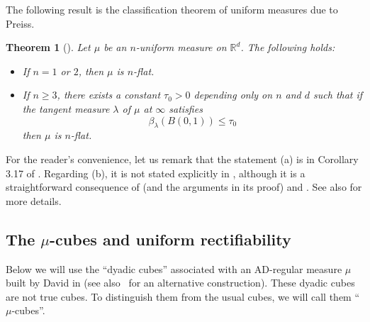 \documentclass[11pt]{amsart}
\newcommand{\R}{{\mathbb R}}       %
\newcommand{\rf}[1]{{(\ref{#1})}}
\newcommand{\vv}{{\vspace{2mm}}}
\newtheorem{theorem}{Theorem}[section]
\theoremstyle{definition}
\theoremstyle{remark}
\numberwithin{equation}{section}
\begin{document}
The following result is the classification theorem of uniform
measures due to Preiss.

\vv
\begin{theorem}[\cite{Pr}]\label{teopreiss}
Let $\mu$ be an $n$-uniform measure on $\R^d$. The following holds:
\begin{itemize}
\item[(a)] If $n=1$ or $2$, then $\mu$ is $n$-flat.
\item[(b)] If $n\geq3$, there exists a constant $\tau_0>0$ depending only on $n$ and $d$ such that
if the tangent measure $\lambda$ of $\mu$ at $\infty$  satisfies
\begin{equation}\label{infty}
\beta_\lambda(B(0,1)) \leq \tau_0
\end{equation}
then $\mu$ is $n$-flat.
\end{itemize}
\end{theorem}
\vv

For the reader's convenience, let us remark that the statement (a)
is in Corollary 3.17 of \cite{Pr}.
Regarding (b), it
is not stated explicitly in \cite{Pr}, although it is a straightforward consequence of
\cite[Theorem 3.14 (1)]{Pr} (and the arguments in its proof) and \cite[Corollary 3.16]{Pr}.
See also \cite[Propositions 6.18 and 6.19]{DeL} for more details.










\vv

\subsection{The $\mu$-cubes and uniform rectifiability}

Below we will use the ``dyadic cubes'' associated with an AD-regular measure $\mu$ built by David in \cite[Appendix 1]{David-wavelets} (see also~\cite{Christ} 
for an alternative construction). 
These dyadic cubes are not true cubes. To
distinguish them from the usual cubes, we will call them ``$\mu$-cubes''. 
\end{document}

